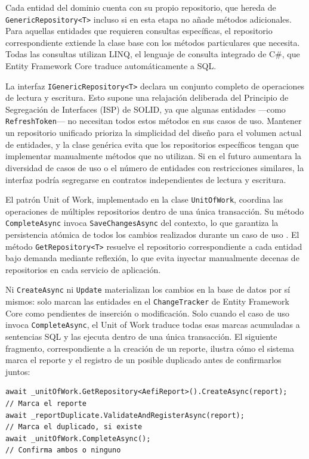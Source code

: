 Cada entidad del dominio cuenta con su propio repositorio, que hereda de \texttt{Generic\-Repository<T>} incluso si en esta etapa no añade métodos adicionales. Para aquellas entidades que requieren consultas específicas, el repositorio correspondiente extiende la clase base con los métodos particulares que necesita. Todas las consultas utilizan LINQ, el lenguaje de consulta integrado de C\#, que Entity Framework Core traduce automáticamente a SQL.

La interfaz \texttt{IGenericRepository<T>} declara un conjunto completo de operaciones de lectura y escritura. 
Esto supone una relajación deliberada del Principio de Segregación de Interfaces (ISP) de SOLID, ya que algunas entidades —como \texttt{RefreshToken}— no necesitan todos estos métodos en sus casos de uso. 
Mantener un repositorio unificado prioriza la simplicidad del diseño para el volumen actual de entidades, y la clase genérica evita que los repositorios específicos tengan que implementar manualmente métodos que no utilizan. 
Si en el futuro aumentara la diversidad de casos de uso o el número de entidades con restricciones similares, la interfaz podría segregarse en contratos independientes de lectura y escritura.

El patrón Unit of Work, implementado en la clase \texttt{UnitOfWork}, coordina las operaciones de múltiples repositorios dentro de una única transacción. Su método \texttt{CompleteAsync} invoca \texttt{SaveChangesAsync} del contexto, lo que garantiza la persistencia atómica de todos los cambios realizados durante un caso de uso \cite{martin_fowler_uow}.
El método \texttt{GetRepository<T>} resuelve el repositorio correspondiente a cada entidad bajo demanda mediante reflexión, lo que evita inyectar manualmente decenas de repositorios en cada servicio de aplicación.

Ni \texttt{CreateAsync} ni \texttt{Update} materializan los cambios en la base de datos por sí mismos: solo marcan las entidades en el \texttt{ChangeTracker} de Entity Framework Core como pendientes de inserción o modificación. Solo cuando el caso de uso invoca \texttt{CompleteAsync}, el Unit of Work traduce todas esas marcas acumuladas a sentencias SQL y las ejecuta dentro de una única transacción. 
El siguiente fragmento, correspondiente a la creación de un reporte, ilustra cómo el sistema marca el reporte y el registro de un posible duplicado antes de confirmarlos juntos:

\begin{lstlisting}[language={[Sharp]C}, caption={Marcado de entidades y confirmación atómica}, label={lst:unitofwork_atomic}]
await _unitOfWork.GetRepository<AefiReport>().CreateAsync(report);   // Marca el reporte
await _reportDuplicate.ValidateAndRegisterAsync(report);             // Marca el duplicado, si existe
await _unitOfWork.CompleteAsync();                                   // Confirma ambos o ninguno
\end{lstlisting}

